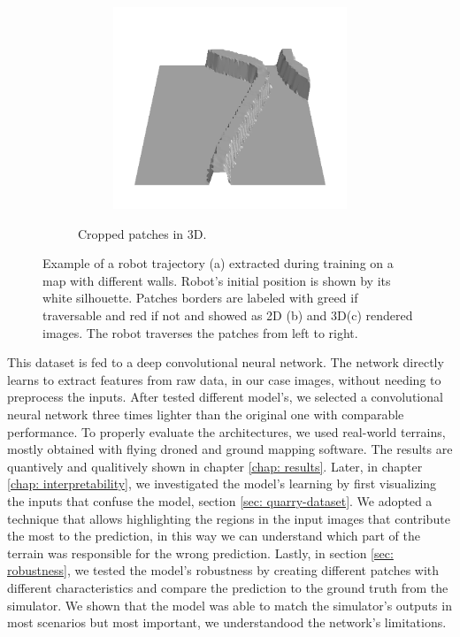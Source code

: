\documentclass[../document.tex]{subfiles}
\begin{document}
\begin{figure} [htbp]
\begin{subfigure}[b]{1\textwidth}
\begin{subfigure}[b]{0.24\textwidth}
    \includegraphics[width=\linewidth]{../img/bars1-example-patches/3d/14.png}    
    \end{subfigure}  
\caption{Cropped patches in 3D.}
\label{fig : patch-extraction}
\end{subfigure}
\caption{Example of a robot trajectory (a) extracted during training on a map with different walls. Robot's initial position is shown by its white silhouette. Patches borders are labeled with greed if traversable and red if not and showed as 2D (b) and 3D(c) rendered images. The robot traverses the patches from left to right.}
\end{figure}

This dataset is fed to a deep convolutional neural network. The network directly learns to extract features from raw data, in our case images, without needing to preprocess the inputs. After tested different model's, we selected a convolutional neural network three times lighter than the original one with comparable performance. To properly evaluate the architectures, we used real-world terrains, mostly obtained with flying droned and ground mapping software.
The results are quantively and qualitively shown in chapter \ref{chap: results}.
Later, in chapter \ref{chap: interpretability}, we investigated the model's learning by first visualizing the inputs that confuse the model, section \ref{sec: quarry-dataset}. We adopted a technique that allows highlighting the regions in the input images that contribute the most to the prediction, in this way we can understand which part of the terrain was responsible for the wrong prediction. Lastly, in section \ref{sec: robustness}, we tested the model's robustness by creating different patches with different characteristics and compare the prediction to the ground truth from the simulator. We shown that the model was able to match the simulator's outputs in most scenarios but most important, we understandood the network's limitations.
\end{document}
